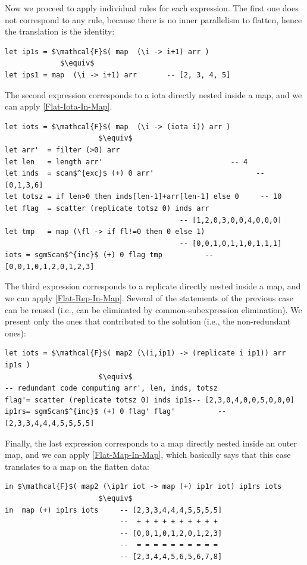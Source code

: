 \documentclass[acmsmall,review]{acmart}\settopmatter{printfolios=true,printccs=false,printacmref=false}
\begin{document}
Now we proceed to apply individual rules for each expression.
The first one does not correspond to any rule, because there is
no inner parallelism to flatten, hence the translation is the identity:
\begin{lstlisting}[mathescape=true]
let ip1s = $\mathcal{F}$( map  (\i -> i+1) arr ) 
             $\equiv$
let ips1 = map  (\i -> i+1) arr       -- [2, 3, 4, 5]
\end{lstlisting}\vspace{-2ex}

The second expression corresponds to a iota directly nested inside a map,
and we can apply \cref{Flat-Iota-In-Map}.
\begin{lstlisting}[mathescape=true]
let iots = $\mathcal{F}$( map  (\i -> (iota i)) arr )  
                      $\equiv$
let arr'  = filter (>0) arr
let len   = length arr'                              -- 4
let inds  = scan$^{exc}$ (+) 0 arr'                        -- [0,1,3,6]
let totsz = if len>0 then inds[len-1]+arr[len-1] else 0     -- 10
let flag  = scatter (replicate totsz 0) inds arr
                                         -- [1,2,0,3,0,0,4,0,0,0]
let tmp   = map (\fl -> if fl!=0 then 0 else 1) 
                                         -- [0,0,1,0,1,1,0,1,1,1]
iots = sgmScan$^{inc}$ (+) 0 flag tmp          -- [0,0,1,0,1,2,0,1,2,3]
\end{lstlisting}\vspace{-2ex}

The third expression corresponds to a replicate directly nested inside a map,
and we can apply \cref{Flat-Rep-In-Map}. Several of the statements of the 
previous case can be reused (i.e., can be eliminated by common-subexpression
elimination). We present only the ones that contributed to the solution
(i.e., the non-redundant ones):\medskip
\begin{lstlisting}[mathescape=true]
let iots = $\mathcal{F}$( map2 (\(i,ip1) -> (replicate i ip1)) arr ip1s )
                      $\equiv$
-- redundant code computing arr', len, inds, totsz
flag'= scatter (replicate totsz 0) inds ip1s-- [2,3,0,4,0,0,5,0,0,0]
ip1rs= sgmScan$^{inc}$ (+) 0 flag' flag'          -- [2,3,3,4,4,4,5,5,5,5]
\end{lstlisting}\vspace{-2ex}

Finally, the last expression corresponds to a map directly nested inside
an outer map, and we can apply \cref{Flat-Map-In-Map}, which basically says
that this case translates to a map on the flatten data:
\begin{lstlisting}[mathescape=true]
in $\mathcal{F}$( map2 (\ip1r iot -> map (+) ip1r iot) ip1rs iots
                      $\equiv$
in  map (+) ip1rs iots     -- [2,3,3,4,4,4,5,5,5,5]
                           --  + + + + + + + + + +
                           -- [0,0,1,0,1,2,0,1,2,3]
                           --  = = = = = = = = = =
                           -- [2,3,4,4,5,6,5,6,7,8]
\end{lstlisting}\vspace{-2ex}
\end{document}

